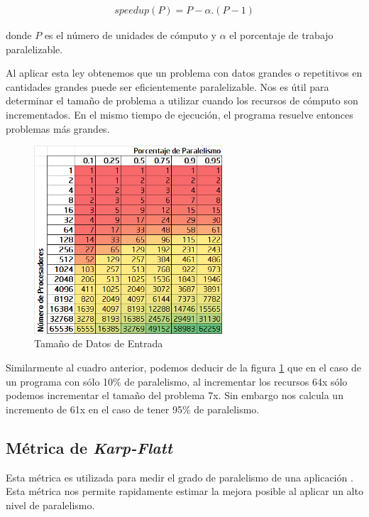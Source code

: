 \documentclass[a4paper]{report}
\begin{document}
\begin{eqnarray}
\label{eq:gustafson}
speedup(P) = P - \alpha . ( P - 1)
\end{eqnarray}

donde $ P $ es el n\'umero de unidades de c\'omputo y $ \alpha $ el porcentaje de trabajo paralelizable.

\bigskip

Al aplicar esta ley obtenemos que un problema con datos grandes o repetitivos en cantidades grandes puede ser
eficientemente paralelizable. Nos es \'util para determinar el tama\~no de problema a utilizar cuando los recursos de c\'omputo son incrementados.
En el mismo tiempo de ejecuci\'on, el programa resuelve entonces problemas m\'as grandes.

\begin{figure}[H]
\begin{center}
\includegraphics[width=7cm]{gustafson.png}
\caption{Tama\~no de Datos de Entrada}
\label{fig:gustafson}
\end{center}
\end{figure}

Similarmente al cuadro anterior, podemos deducir de la figura \ref{fig:gustafson} que en el caso de un programa con s\'olo 10\% de paralelismo,
al incrementar los recursos 64x s\'olo podemos incrementar el tama\~no del problema 7x. Sin embargo nos calcula
un incremento de 61x en el caso de tener 95\% de paralelismo.

\subsection{M\'etrica de {\it Karp-Flatt}}

Esta m\'etrica es utilizada para medir el grado de paralelismo de una aplicaci\'on \cite{karp-flatt}.
Esta m\'etrica nos permite rapidamente estimar la mejora posible al aplicar un alto nivel de paralelismo.
\end{document}
